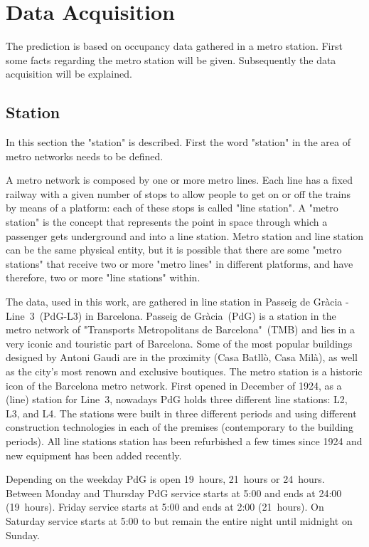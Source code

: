 \section{Data Acquisition}
\label{sec:dataAcquisition}

The prediction is based on occupancy data gathered in a metro station. First some facts regarding the metro station will be given. Subsequently the data acquisition will be explained.

\subsection{Station}
\label{subsec:station}

In this section the "station" is described. First the word "station" in the area of metro networks needs to be defined.

A metro network is composed by one or more metro lines. Each line has a fixed railway with a given number of stops to allow people to get on or off the trains by means of a platform: each of these stops is called "line station". A "metro station" is the concept that represents the point in space through which a passenger gets underground and into a line station. Metro station and line station can be the same physical entity, but it is possible that there are some "metro stations" that receive two or more "metro lines" in different platforms, and have therefore, two or more "line stations" within.

The data, used in this work, are gathered in line station in Passeig de Gr\`{a}cia - Line~3~(PdG-L3) in Barcelona. Passeig de Gr\`{a}cia~(PdG) is a station in the metro network of "Transports Metropolitans de Barcelona"~(TMB) and lies in a very iconic and touristic part of Barcelona. Some of the most popular buildings designed by Antoni Gaudi are in the proximity (Casa Batll\`{o}, Casa Mil\`{a}), as well as the city's most renown and exclusive boutiques.
The metro station is a historic icon of the Barcelona metro network. First opened in December of 1924, as a (line) station for Line~3, nowadays PdG holds three different line stations: L2, L3, and L4. The stations were built in three different periods and using different construction technologies in each of the premises (contemporary to the building periods). All line stations station has been refurbished a few times since 1924 and new equipment has been added recently.

Depending on the weekday PdG is open 19~hours, 21~hours or 24~hours. Between Monday and Thursday PdG service starts at 5:00 and ends at 24:00 (19~hours). Friday service starts at 5:00 and ends at 2:00 (21~hours). On Saturday service starts at 5:00 to but remain the entire night until midnight on Sunday.

